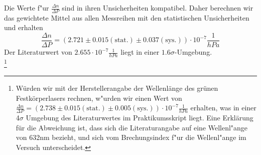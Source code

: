 \documentclass[12pt,a4paper]{article}
\begin{document}
Die Werte f"ur $\frac{\Delta n}{\Delta P}$ sind in ihren Unsicherheiten kompatibel. Daher berechnen wir das gewichtete Mittel aus allen Messreihen mit den statistischen Unsicherheiten und erhalten
\begin{equation}
\frac{\Delta n}{\Delta P}=(2.721\pm 0.015(\text{stat.})\pm 0.037(\text{sys.}))\cdot10^{-7}\frac{1}{hPa}
\end{equation}
Der Literaturwert von $2.655\cdot10^{-7}\frac{1}{hPa}$ liegt in einer $1.6\sigma$-Umgebung.\\
\footnote{Würden wir mit der Herstellerangabe der Wellenlänge des grünen Festkörperlasers rechnen, w"urden wir einen Wert von $\frac{\Delta n}{\Delta P}=(2.738\pm 0.015(\text{stat.})\pm 0.005(\text{sys.}))\cdot10^{-7}\frac{1}{hPa}$ erhalten, was in einer 4$\sigma$ Umgebung des Literaturwertes im Praktikumsskript liegt. Eine Erklärung für die Abweichung ist, dass sich die Literaturangabe auf eine Wellenl"ange von 632nm bezieht, und sich vom Brechungsindex f"ur die Wellenl"ange im Versuch unterscheidet.}

\newpage
\end{document}
